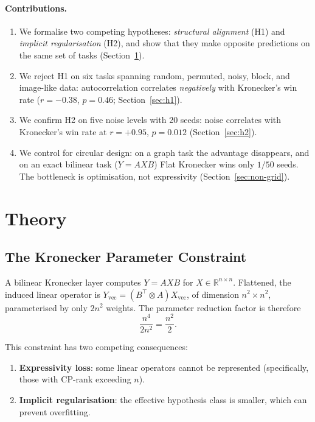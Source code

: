 \documentclass[11pt,a4paper]{article}
\begin{document}
\paragraph{Contributions.}
\begin{enumerate}
\item We formalise two competing hypotheses: \emph{structural
alignment} (H1) and \emph{implicit regularisation} (H2), and show
that they make opposite predictions on the same set of tasks
(Section~\ref{sec:theory}).
\item We reject H1 on six tasks spanning random, permuted, noisy,
block, and image-like data: autocorrelation correlates
\emph{negatively} with Kronecker's win rate
($r = -0.38$, $p = 0.46$; Section~\ref{sec:h1}).
\item We confirm H2 on five noise levels with 20 seeds: noise
correlates with Kronecker's win rate at $r = +0.95$,
$p = 0.012$ (Section~\ref{sec:h2}).
\item We control for circular design: on a graph task the
advantage disappears, and on an exact bilinear task
($Y = AXB$) Flat Kronecker wins only $1/50$ seeds. The bottleneck
is optimisation, not expressivity (Section~\ref{sec:non-grid}).
\end{enumerate}


\section{Theory}
\label{sec:theory}

\subsection{The Kronecker Parameter Constraint}
\label{sec:constraint}

A bilinear Kronecker layer computes $Y = A X B$ for
$X \in \mathbb{R}^{n \times n}$. Flattened, the induced linear
operator is $Y_{\text{vec}} = (B^\top \otimes A) X_{\text{vec}}$,
of dimension $n^2 \times n^2$, parameterised by only $2n^2$
weights. The parameter reduction factor is therefore
\begin{equation}
\frac{n^4}{2n^2} = \frac{n^2}{2}.
\label{eq:reduction}
\end{equation}

This constraint has two competing consequences:
\begin{enumerate}
\item \textbf{Expressivity loss}: some linear operators cannot be
represented (specifically, those with CP-rank exceeding $n$).
\item \textbf{Implicit regularisation}: the effective hypothesis
class is smaller, which can prevent overfitting.
\end{enumerate}
\end{document}
